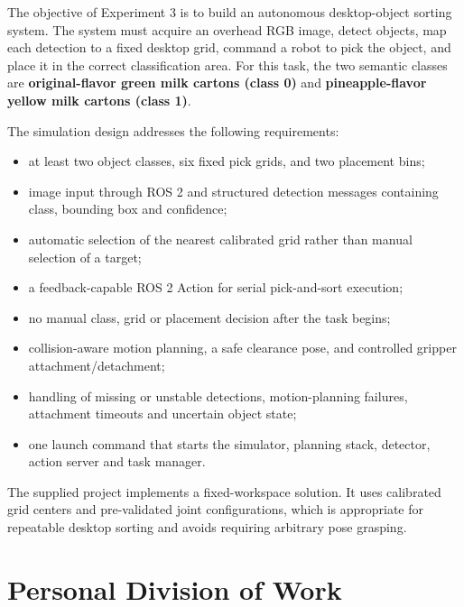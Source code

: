 \documentclass[11pt,a4paper]{article}
\begin{document}
The objective of Experiment 3 is to build an autonomous desktop-object sorting system. The system must acquire an overhead RGB image, detect objects, map each detection to a fixed desktop grid, command a robot to pick the object, and place it in the correct classification area. For this task, the two semantic classes are \textbf{original-flavor green milk cartons (class 0)} and \textbf{pineapple-flavor yellow milk cartons (class 1)}.

The simulation design addresses the following requirements:
\begin{itemize}
  \item at least two object classes, six fixed pick grids, and two placement bins;
  \item image input through ROS 2 and structured detection messages containing class, bounding box and confidence;
  \item automatic selection of the nearest calibrated grid rather than manual selection of a target;
  \item a feedback-capable ROS 2 Action for serial pick-and-sort execution;
  \item no manual class, grid or placement decision after the task begins;
  \item collision-aware motion planning, a safe clearance pose, and controlled gripper attachment/detachment;
  \item handling of missing or unstable detections, motion-planning failures, attachment timeouts and uncertain object state;
  \item one launch command that starts the simulator, planning stack, detector, action server and task manager.
\end{itemize}

The supplied project implements a fixed-workspace solution. It uses calibrated grid centers and pre-validated joint configurations, which is appropriate for repeatable desktop sorting and avoids requiring arbitrary pose grasping.

\section{Personal Division of Work}
\end{document}
